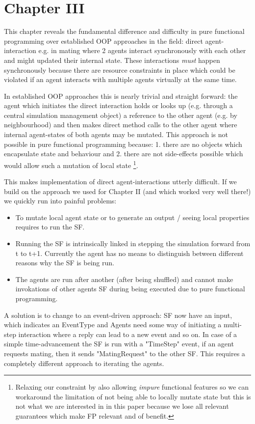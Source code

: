 \section{Chapter III}
This chapter reveals the fundamental difference and difficulty in pure functional programming over established OOP approaches in the field: direct agent-interaction e.g. in mating where 2 agents interact synchronously with each other and might updated their internal state. These interactions \textit{must} happen synchronously because there are resource constraints in place which could be violated if an agent interacts with multiple agents virtually at the same time.

In established OOP approaches this is nearly trivial and straight forward: the agent which initiates the direct interaction holds or looks up (e.g. through a central simulation management object) a reference to the other agent (e.g. by neighbourhood) and then makes direct method calls to the other agent where internal agent-states of both agents may be mutated.
This approach is not possible in pure functional programming because: 1. there are no objects which encapsulate state and behaviour and 2. there are not side-effects possible which would allow such a mutation of local state \footnote{Relaxing our constraint by also allowing \textit{impure} functional features so we can workaround the limitation of not being able to locally mutate state but this is not what we are interested in in this paper because we lose all relevant guarantees which make FP relevant and of benefit.}. 

This makes implementation of direct agent-interactions utterly difficult.
If we build on the approach we used for Chapter II (and which worked very well there!) we quickly run into painful problems:
\begin{itemize}
	\item To mutate local agent state or to generate an output / seeing local properties requires to run the SF. 
	\item Running the SF is intrinsically linked in stepping the simulation forward from t to t+1. Currently the agent has no means to distinguish between different reasons why the SF is being run.
	\item The agents are run after another (after being shuffled) and cannot make invokations of other agents SF during being executed due to pure functional programming.
\end{itemize}

A solution is to change to an event-driven approach: SF now have an input, which indicates an EventType and Agents need some way of initiating a multi-step interaction where a reply can lead to a new event and so on. In case of a simple time-advancement the SF is run with a "TimeStep" event, if an agent requests mating, then it sends "MatingRequest" to the other SF. This requires a completely different approach to iterating the agents.

